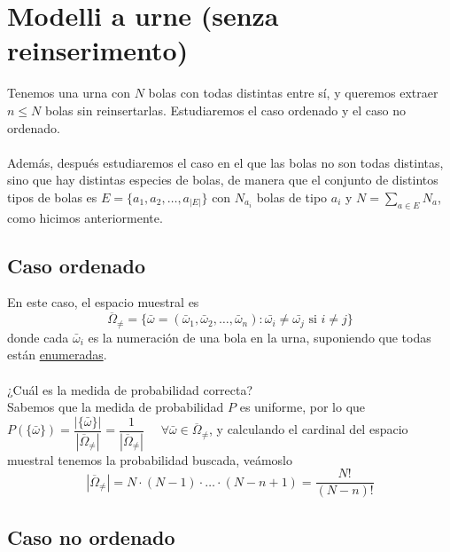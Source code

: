 
\section{Modelli a urne (senza reinserimento)}
Tenemos una urna con $N$ bolas con todas distintas entre sí, y queremos extraer $n\leq N$ bolas sin reinsertarlas. Estudiaremos el caso ordenado y el caso no ordenado. \\ \\

\noindent
Además, después estudiaremos el caso en el que las bolas no son todas distintas, sino que hay distintas especies de bolas, de manera que el conjunto de distintos tipos de bolas es $E=\{a_1, a_2, \ldots, a_{|E|}\}$ con $N_{a_i}$ bolas de tipo $a_i$ y $N=\sum\limits_{a\in E} N_a$, como hicimos anteriormente.

\subsection{Caso ordenado}
\noindent
En este caso, el espacio muestral es 
\begin{equation*}
    \overline{\Omega}_{\neq}=\{\bar{\omega}=(\bar{\omega}_1, \bar{\omega}_2, \ldots, \bar{\omega}_n): \bar{\omega_i}\neq \bar{\omega_j} \text{ si } i\neq j\}
\end{equation*}
donde cada $\bar{\omega}_i$ es la numeración de una bola en la urna, suponiendo que todas están \underline{enumeradas}. \\ \\
\noindent
{}¿Cuál es la medida de probabilidad correcta? \\
\noindent
Sabemos que la medida de probabilidad $P$ es uniforme, por lo que $P(\{\bar{\omega}\})=\dfrac{|\{\bar{\omega}\}|}{|\overline{\Omega}_{\neq}|}=\dfrac{1}{|\overline{\Omega}_{\neq}|} \quad$ \mbox{$\forall \bar{\omega}\in \overline{\Omega}_{\neq}$}, y calculando el cardinal del espacio muestral tenemos la probabilidad buscada, veámoslo
\begin{equation*}
    |\overline{\Omega}_{\neq}| = N \cdot (N-1) \cdot \ldots \cdot (N-n+1) = \dfrac{N!}{(N-n)!}
\end{equation*}

\subsection{Caso no ordenado}
